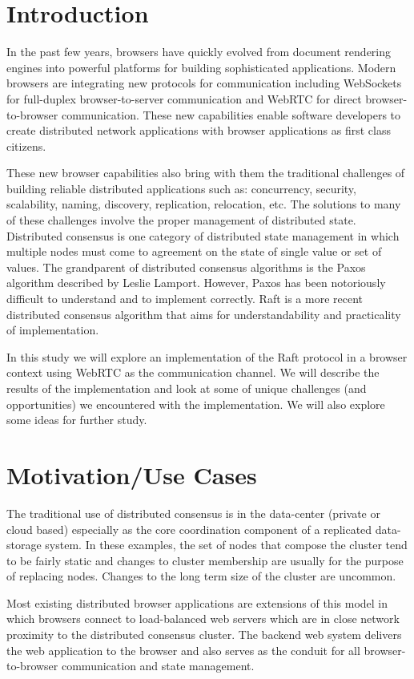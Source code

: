 \documentclass{acmtog} %
\begin{document}
\section{Introduction}
In the past few years, browsers have quickly evolved from document
rendering engines into powerful platforms for building sophisticated
applications. Modern browsers are integrating new protocols for
communication including WebSockets for full-duplex browser-to-server
communication and WebRTC for direct browser-to-browser communication.
These new capabilities enable software developers to create
distributed network applications with browser applications as first
class citizens.

These new browser capabilities also bring with them the traditional
challenges of building reliable distributed applications such as:
concurrency, security, scalability, naming, discovery, replication,
relocation, etc. The solutions to many of these challenges involve
the proper management of distributed state. Distributed consensus is
one category of distributed state management in which multiple nodes
must come to agreement on the state of single value or set of values.
The grandparent of distributed consensus algorithms is the Paxos
algorithm described by Leslie Lamport. However, Paxos has been
notoriously difficult to understand and to implement correctly. Raft
is a more recent distributed consensus algorithm that aims for
understandability and practicality of implementation.

In this study we will explore an implementation of the Raft protocol
in a browser context using WebRTC as the communication channel. We
will describe the results of the implementation and look at some of
unique challenges (and opportunities) we encountered with the
implementation. We will also explore some ideas for further study.

\section{Motivation/Use Cases}
The traditional use of distributed consensus is in the data-center
(private or cloud based) especially as the core coordination component
of a replicated data-storage system. In these examples, the set of
nodes that compose the cluster tend to be fairly static and changes to
cluster membership are usually for the purpose of replacing nodes.
Changes to the long term size of the cluster are uncommon.

Most existing distributed browser applications are extensions of this
model in which browsers connect to load-balanced web servers which are
in close network proximity to the distributed consensus cluster. The
backend web system delivers the web application to the browser and
also serves as the conduit for all browser-to-browser communication
and state management.
\end{document}
